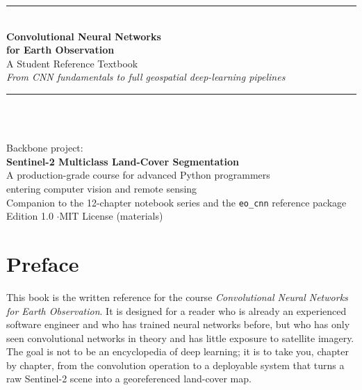 \documentclass[11pt,openany]{book}
\theoremstyle{definition}
\begin{document}
\frontmatter

\begin{titlepage}
\centering
\vspace*{1.5cm}
{\color{eoblue}\rule{\linewidth}{1.5pt}}\\[6pt]
{\Huge\bfseries\color{eodark} Convolutional Neural Networks\\[4pt] for Earth Observation}\\[10pt]
{\Large A Student Reference Textbook}\\[6pt]
{\large\itshape From CNN fundamentals to full geospatial deep-learning pipelines}\\[4pt]
{\color{eoblue}\rule{\linewidth}{1.5pt}}\\[1.4cm]

\\[1.4cm]

{\large Backbone project:\\[2pt]\textbf{Sentinel-2 Multiclass Land-Cover Segmentation}}\\[1.2cm]

{\large A production-grade course for advanced Python programmers\\ entering computer vision and remote sensing}\\[2cm]

{\large Companion to the 12-chapter notebook series and the \texttt{eo\_cnn} reference package}\\[0.6cm]
{\small Edition 1.0 \quad$\cdot$\quad MIT License (materials)}
\vfill
\end{titlepage}

\tableofcontents

\chapter*{Preface}

This book is the written reference for the course \emph{Convolutional Neural
Networks for Earth Observation}. It is designed for a reader who is already an
experienced software engineer and who has trained neural networks before, but
who has only seen convolutional networks in theory and has little exposure to
satellite imagery. The goal is not to be an encyclopedia of deep learning;
it is to take you, chapter by chapter, from the convolution operation to a
deployable system that turns a raw Sentinel-2 scene into a georeferenced
land-cover map.
\end{document}
